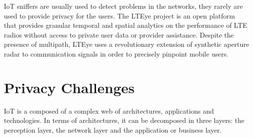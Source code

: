 \documentclass[conference]{IEEEtran}
\begin{document}
IoT sniffers are usually used to detect problems in the networks, they rarely
are used to provide privacy for the users.
The LTEye project \cite{KumarLTE} is an open platform that provides
granular temporal and spatial analytics on the performance of LTE radios without
access to private user data or provider assistance. Despite the presence of multipath,
LTEye uses a revolutionary extension of synthetic aperture radar to communication
signals in order to precisely pinpoint mobile users.

\section{Privacy Challenges}

IoT is a composed of a complex web of architectures, applications and
technologies. In terms of architectures, it can be decomposed in three
layers: the perception layer, the network layer and the application or
business layer.
\end{document}
